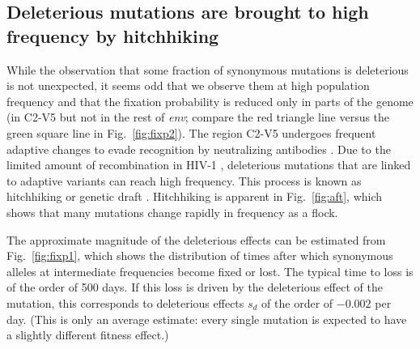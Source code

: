 \documentclass[rmp, twocolumn]{revtex4}
\newcommand{\FIG}[1]{Fig.~\ref{fig:#1}}
\newcommand{\env}{\textit{env}}
\newcommand{\shankaregion}{C2-V5}
\begin{document}
\subsection{Deleterious mutations are brought to high frequency by hitchhiking}

While the observation that some fraction of synonymous mutations is deleterious
is not unexpected, it seems odd that we observe them at high population
frequency and that the fixation probability is reduced only in parts of the
genome (in \shankaregion{} but not in the rest of \env{}; compare the red
triangle line versus the green square line in \FIG{fixp2}).
The region \shankaregion{} undergoes frequent adaptive changes to evade
recognition by neutralizing antibodies \cite{williamson_adaptation_2003,
richman_rapid_2003}. Due to the limited amount of recombination in HIV-1
\cite{neher_recombination_2010, batorsky_estimate_2011}, deleterious mutations
that are linked to adaptive variants can reach high frequency. This process is
known as hitchhiking \citep{smith_hitch-hiking_1974} or genetic draft
\citep{gillespie_genetic_2000,neher_genetic_2011}. Hitchhiking is  apparent in
\FIG{aft}, which shows that many mutations change rapidly in frequency as a
flock. 

The approximate magnitude of the deleterious effects can be estimated from
\FIG{fixp1}, which shows the distribution of times after which synonymous
alleles at intermediate frequencies become fixed or lost. The typical time to
loss is of the order of 500 days. If this loss is driven by the deleterious
effect of the mutation, this corresponds to deleterious effects $s_d$ of the
order of $- 0.002$ per day. (This is only an average estimate: every single
mutation is expected to have a slightly different fitness effect.)
\end{document}
